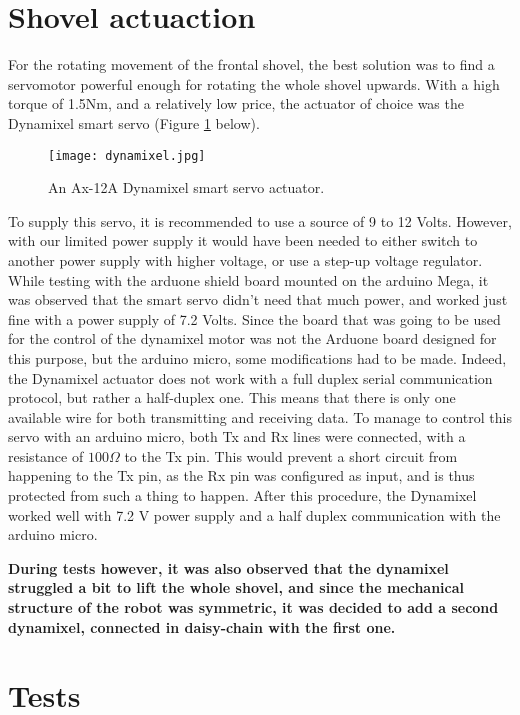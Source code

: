 \section{Shovel actuaction}

For the rotating movement of the frontal shovel, the best solution was to find a servomotor powerful enough for rotating the whole shovel upwards. With a high torque of 1.5Nm, and a relatively low price, the actuator of choice was the Dynamixel smart servo (Figure \ref{fig:dynamixel} below). 

\begin{figure}[H]
  \centering
  \texttt{[image: dynamixel.jpg]}
  \caption{An Ax-12A Dynamixel smart servo actuator.}
\label{fig:dynamixel}
\end{figure}

To supply this servo, it is recommended to use a source of 9 to 12 Volts. However, with our limited power supply it would have been needed to either switch to another power supply with higher voltage, or use a step-up voltage regulator. While testing with the arduone shield board mounted on the arduino Mega, it was observed that the smart servo didn't need that much power, and worked just fine with a power supply of 7.2 Volts. Since the board that was going to be used for the control of the dynamixel motor was not the Arduone board designed for this purpose, but the arduino micro, some modifications had to be made. Indeed, the Dynamixel actuator does not work with a full duplex serial communication protocol, but rather a half-duplex one. This means that there is only one available wire for both transmitting and receiving data. To manage to control this servo with an arduino micro, both Tx and Rx lines were connected, with a resistance of $100 \Omega$ to the Tx pin. This would prevent a short circuit from happening to the Tx pin, as the Rx pin was configured as input, and is thus protected from such a thing to happen. After this procedure, the Dynamixel worked well with 7.2 V power supply and a half duplex communication with the arduino micro.

\textbf{During tests however, it was also observed that the dynamixel struggled a bit to lift the whole shovel, and since the mechanical structure of the robot was symmetric, it was decided to add a second dynamixel, connected in daisy-chain with the first one.}

\section{Tests}
 
